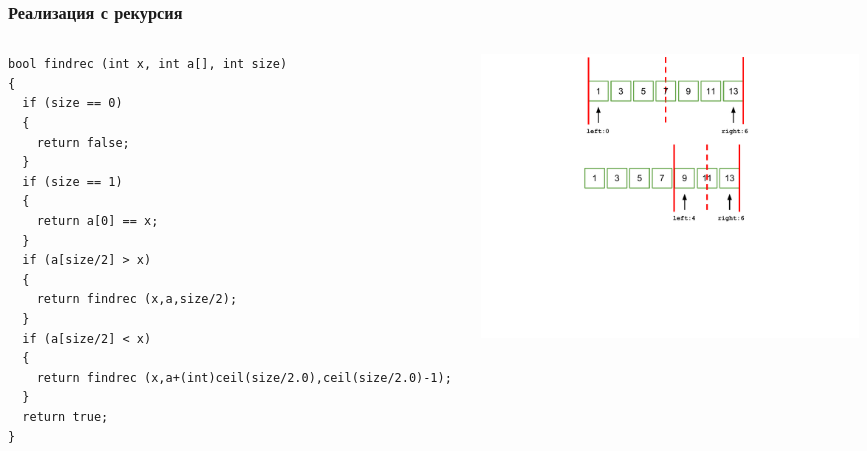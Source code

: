 \documentclass{beamer}
\begin{document}
\begin{frame}[fragile]
\frametitle{Реализация с рекурсия}



\begin{columns}[t]
  \begin{column}{0.5\textwidth}

\begin{lstlisting}
bool findrec (int x, int a[], int size)
{
  if (size == 0)
  {
    return false;
  }
  if (size == 1)
  {
    return a[0] == x;
  }
  if (a[size/2] > x)
  {
    return findrec (x,a,size/2);
  }
  if (a[size/2] < x)
  {
    return findrec (x,a+(int)ceil(size/2.0),ceil(size/2.0)-1);
  }
  return true;
}
\end{lstlisting}


  \end{column}
  \begin{column}{0.5\textwidth}
\vspace*{-1pt}
\hspace*{-50pt}
\includegraphics[width=10cm]{images/binsearch_smaller}

  \end{column}
\end{columns}



\end{frame}
\end{document}
